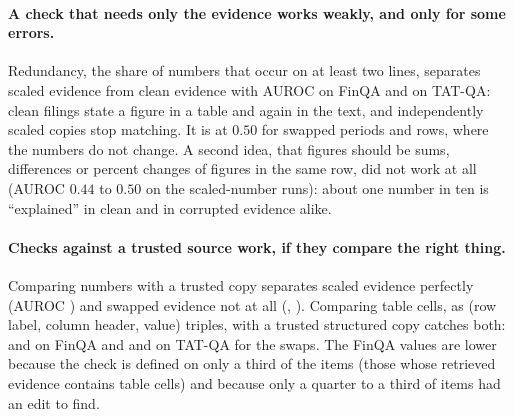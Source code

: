 \begin{table}[t]
\centering\small
\resizebox{\textwidth}{!}{}
\caption{AUROC (95\% interval) of three evidence-side checks for telling edited from clean evidence of the same item. ``edited'' is the share of items whose evidence text changed. $^\S$ in parentheses: the share of items on which the check is defined (it needs table cells in the retrieved evidence); the AUROC is computed on those items.}
\label{tab:evidence}
\end{table}

\paragraph{A check that needs only the evidence works weakly, and only for some errors.}
Redundancy, the share of numbers that occur on at least two lines, separates scaled evidence from clean evidence with AUROC \evRedFinScaled{} on FinQA and \evRedTatScaled{} on TAT-QA: clean filings state a figure in a table and again in the text, and independently scaled copies stop matching. It is at $0.50$ for swapped periods and rows, where the numbers do not change. A second idea, that figures should be sums, differences or percent changes of figures in the same row, did not work at all (AUROC $0.44$ to $0.50$ on the scaled-number runs): about one number in ten is ``explained'' in clean and in corrupted evidence alike.

\paragraph{Checks against a trusted source work, if they compare the right thing.}
Comparing numbers with a trusted copy separates scaled evidence perfectly (AUROC \evNumFinScaled) and swapped evidence not at all (\evNumFinPeriod, \evNumTatRow). Comparing table cells, as (row label, column header, value) triples, with a trusted structured copy catches both: \evPairFinPeriod{} and \evPairFinRow{} on FinQA and \evPairTatPeriod{} and \evPairTatRow{} on TAT-QA for the swaps. The FinQA values are lower because the check is defined on only a third of the items (those whose retrieved evidence contains table cells) and because only a quarter to a third of items had an edit to find.

